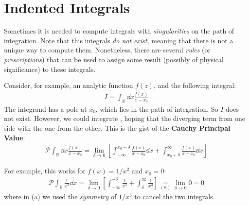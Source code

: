 \documentclass[../template.tex]{subfiles}
\begin{document}
\section{Indented Integrals}
Sometimes it is needed to compute integrals with \textit{singularities} on the path of integration. Note that this integrals \textit{do not exist}, meaning that there is not a unique way to compute them. Nonetheless, there are several \textit{rules} (or \textit{prescriptions}) that can be used to assign some result (possibly of physical significance) to these integrals.

\medskip

Consider, for example, an analytic function $f(z)$, and the following integral:
\begin{align*}
    I = \int_{\mathbb{R}} \dd{x} \frac{f(x)}{x-x_0} 
\end{align*}
The integrand has a pole at $x_0$, which lies in the path of integration. So $I$ does not exist. However, we could integrate , hoping that the diverging term from one side  with the one from the other. This is the gist of the \textbf{Cauchy Principal Value}:
\begin{align*}
    \mathcal{P}\int_\mathbb{R} \dd{x} \frac{f(x)}{x-x_0} = \lim_{\delta \to 0} \left[\int_{-\infty}^{x_0 - \delta} \frac{f(x)}{x - x_0} \dd{x} + \int_{x_0 + \delta}^\infty \frac{f(x)}{x-x_0} \dd{x}  \right]
\end{align*} 

For example, this works for $f(x) = 1/x^2$ and $x_0 = 0$:
\begin{align*}
    \mathcal{P}\int_\mathbb{R} \frac{1}{x^3} \dd{x} = \lim_{\delta \to 0} \left[\int_{-\infty}^{- \delta} \frac{1}{x^3} + \int_{\delta}^{\infty} \frac{1}{x^3}  \right]  \underset{(a)}{=}  \lim_{\delta \to 0} 0 = 0
\end{align*}
where in (a) we used the \textit{symmetry} of $1/x^3$ to cancel the two integrals.

\medskip
\end{document}
